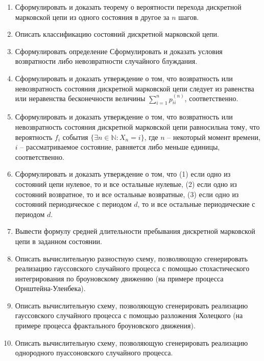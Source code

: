 \documentclass[a4paper,12pt]{extreport}
\renewcommand{\=}[1]{\stackrel{#1}{=}} %
\begin{document}
\begin{enumerate}
	\item Сформулировать и доказать теорему о вероятности перехода 
	дискретной марковской цепи из одного состояния в другое за $n$ шагов.

	\item Описать классификацию состояний дискретной марковской цепи.

	\item Сформулировать определение Сформулировать и доказать условия возвратности либо
	невозвратности случайного блуждания.

	\item Сформулировать и доказать утверждение
	о том, что возвратность или невозвратность состояния дискретной марковской цепи 
	следует из равенства или неравенства бесконечности
	величины $\sum\limits_{i=1}^n p^{(n)}_{ii}$, соответственно.

	\item Сформулировать и доказать утверждение
	о том, что возвратность или невозвратность состояния дискретной марковской цепи 
	равносильна тому, что вероятность $f_i$ события $\{\exists n \in \mathbb{N}: X_n = i\}$,
	где $n$ -- некоторый момент времени, $i$ -- рассматриваемое состояние,
	равняется либо меньше единицы, соответственно.

	\item Сформулировать и доказать утверждение
	о том, что (1) если одно из состояний цепи нулевое, то и все остальные нулевые,
	(2) если одно из состояний возвратное, то и все остальные возвратные,
	(3) если одно из состояний периодическое с периодом $d$, то и все остальные
	периодические с периодом $d$.

	\item Вывести формулу средней длительности пребывания дискретной марковской цепи
	в заданном состоянии.

	\item Описать вычислительную разностную схему, позволяющую
	сгенерировать реализацию гауссовского случайного процесса 
	с помощью стохастического интегрирования по броуновскому движению
	(на примере процесса Орнштейна-Уленбека).

	\item Описать вычислительную схему, позволяющую
	сгенерировать реализацию гауссовского случайного процесса 
	с помощью разложения Холецкого
	(на примере процесса фрактального броуновского движения).

	\item Описать вычислительную схему, позволяющую
	сгенерировать реализацию однородного пуассоновского случайного процесса.


\end{enumerate}
\end{document}
